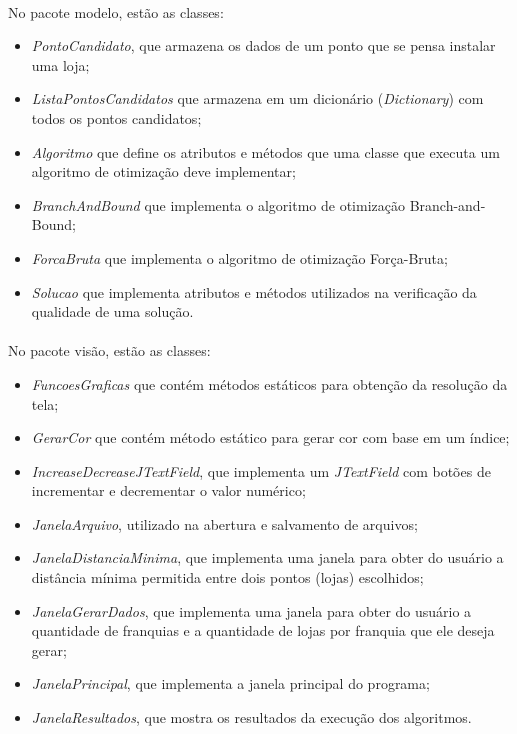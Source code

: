\documentclass[12pt]{article}
\begin{document}
\paragraph{}No pacote modelo, estão as classes:

\begin{itemize}
    \item \textit{PontoCandidato}, que armazena os dados de um ponto que se pensa instalar uma loja; 
    \item \textit{ListaPontosCandidatos} que armazena em um dicionário (\textit{Dictionary}) com todos os pontos candidatos;
    \item \textit{Algoritmo} que define os atributos e métodos que uma classe que executa um algoritmo de otimização deve implementar;
    \item \textit{BranchAndBound} que implementa o algoritmo de otimização Branch-and-Bound;
    \item \textit{ForcaBruta} que implementa o algoritmo de otimização Força-Bruta;
    \item \textit{Solucao} que implementa atributos e métodos utilizados na verificação da qualidade de uma solução.
\end{itemize}

\paragraph{}No pacote visão, estão as classes:

\begin{itemize}
    \item \textit{FuncoesGraficas} que contém métodos estáticos para obtenção da resolução da tela;
    \item \textit{GerarCor} que contém método estático para gerar cor com base em um índice;
    \item \textit{IncreaseDecreaseJTextField}, que implementa um \textit{JTextField} com botões de incrementar e decrementar o valor numérico;
    \item \textit{JanelaArquivo}, utilizado na abertura e salvamento de arquivos;
    \item \textit{JanelaDistanciaMinima}, que implementa uma janela para obter do usuário a distância mínima permitida entre dois pontos (lojas) escolhidos;
    \item \textit{JanelaGerarDados}, que implementa uma janela para obter do usuário a quantidade de franquias e a quantidade de lojas por franquia que ele deseja gerar;
    \item \textit{JanelaPrincipal}, que implementa a janela principal do programa;
    \item \textit{JanelaResultados}, que mostra os resultados da execução dos algoritmos. 
\end{itemize}
\end{document}
